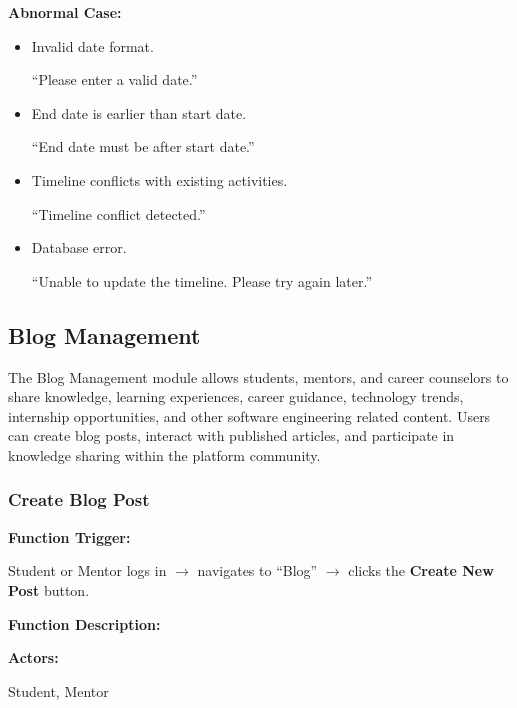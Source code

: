 \vspace{0.2cm}

\textbf{Abnormal Case:}

\begin{itemize}
    \item Invalid date format.

    ``Please enter a valid date.''

    \item End date is earlier than start date.

    ``End date must be after start date.''

    \item Timeline conflicts with existing activities.

    ``Timeline conflict detected.''

    \item Database error.

    ``Unable to update the timeline. Please try again later.''
\end{itemize}

\subsection{Blog Management}

The Blog Management module allows students, mentors, and career counselors to share knowledge, learning experiences, career guidance, technology trends, internship opportunities, and other software engineering related content. Users can create blog posts, interact with published articles, and participate in knowledge sharing within the platform community.

\subsubsection{Create Blog Post}

\textbf{Function Trigger:}

Student or Mentor logs in $\rightarrow$ navigates to ``Blog'' $\rightarrow$ clicks the \textbf{Create New Post} button.

\vspace{0.3cm}

\textbf{Function Description:}

\textbf{Actors:}

Student, Mentor

